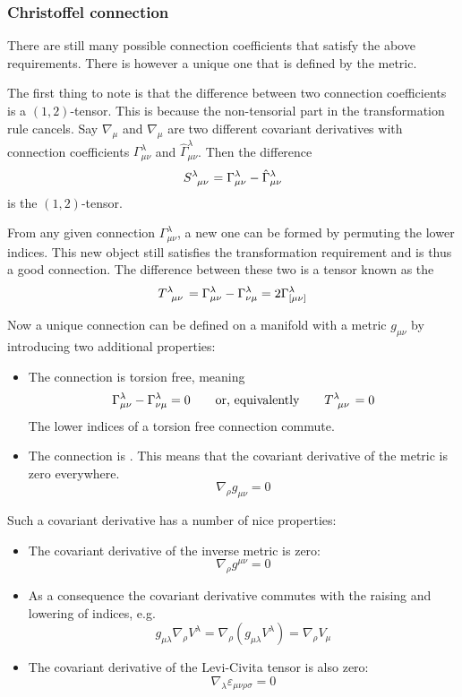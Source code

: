 \subsubsection{Christoffel connection}
There are still many possible connection coefficients that satisfy the above requirements. There is however a unique one that is defined by the metric.

The first thing to note is that the difference between two connection coefficients is a $(1,2)$-tensor. This is because the non-tensorial part in the transformation rule cancels. Say $\nabla_\mu$ and $\hat{\nabla}_\mu$ are two different covariant derivatives with connection coefficients $\Gamma^\lambda_{\mu\nu}$ and $\hat{\Gamma}^\lambda_{\mu\nu}$. Then the difference
\[ \tensor{S}{^\lambda_\mu_\nu} = \Gamma^\lambda_{\mu\nu} - \hat{\Gamma}^\lambda_{\mu\nu}\]
is the $(1,2)$-tensor.

From any given connection $\Gamma^\lambda_{\mu\nu}$, a new one can be formed by permuting the lower indices. This new object still satisfies the transformation requirement and is thus a good connection. The difference between these two is a tensor known as the 
\[ \tensor{T}{^\lambda_\mu_\nu} = \Gamma^\lambda_{\mu\nu} - \Gamma^\lambda_{\nu\mu} = 2\Gamma^\lambda_{[\mu\nu]} \]

Now a unique connection can be defined on a manifold with a metric $g_{\mu\nu}$ by introducing two additional properties:

\begin{itemize}
\item The connection is torsion free, meaning
\[ \Gamma^\lambda_{\mu\nu} - \Gamma^\lambda_{\nu\mu} = 0 \qquad \text{or, equivalently} \qquad \tensor{T}{^\lambda_\mu_\nu} = 0 \]
The lower indices of a torsion free connection commute.
\item The connection is . This means that the covariant derivative of the metric is zero everywhere.
\[ \nabla_\rho g_{\mu\nu} = 0 \]
\end{itemize}
Such a covariant derivative has a number of nice properties:
\begin{eigenschap}
\begin{itemize}
\item The covariant derivative of the inverse metric is zero:
\[ \nabla_\rho g^{\mu\nu} = 0 \]
\item As a consequence the covariant derivative commutes with the raising and lowering of indices, e.g.
\[ g_{\mu\lambda}\nabla_\rho V^\lambda = \nabla_\rho (g_{\mu\lambda}V^\lambda) = \nabla_\rho V_\mu \]
\item The covariant derivative of the Levi-Civita tensor is also zero:
\[ \nabla_\lambda \varepsilon_{\mu\nu\rho\sigma} = 0 \]
\end{itemize}
\end{eigenschap}

